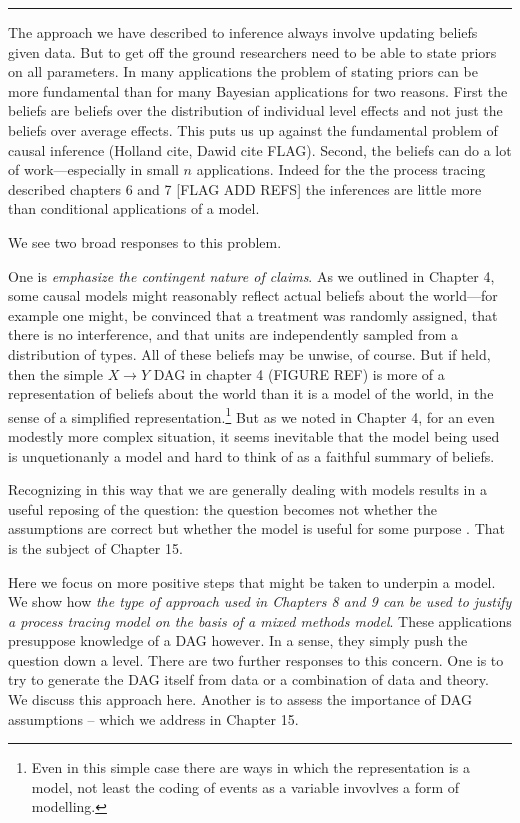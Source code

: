 \documentclass[
  12pt,
]{book}
\begin{document}
\begin{center}\rule{0.5\linewidth}{0.5pt}\end{center}

The approach we have described to inference always involve updating beliefs given data. But to get off the ground researchers need to be able to state priors on all parameters. In many applications the problem of stating priors can be more fundamental than for many Bayesian applications for two reasons. First the beliefs are beliefs over the distribution of individual level effects and not just the beliefs over average effects. This puts us up against the fundamental problem of causal inference (Holland cite, Dawid cite FLAG). Second, the beliefs can do a lot of work---especially in small \(n\) applications. Indeed for the the process tracing described chapters 6 and 7 {[}FLAG ADD REFS{]} the inferences are little more than conditional applications of a model.

We see two broad responses to this problem.

One is \emph{emphasize the contingent nature of claims}. As we outlined in Chapter 4, some causal models might reasonably reflect actual beliefs about the world---for example one might, be convinced that a treatment was randomly assigned, that there is no interference, and that units are independently sampled from a distribution of types. All of these beliefs may be unwise, of course. But if held, then the simple \(X \rightarrow Y\) DAG in chapter 4 (FIGURE REF) is more of a representation of beliefs about the world than it is a model of the world, in the sense of a simplified representation.\footnote{Even in this simple case there are ways in which the representation is a model, not least the coding of events as a variable invovlves a form of modelling.} But as we noted in Chapter 4, for an even modestly more complex situation, it seems inevitable that the model being used is unquetionanly a model and hard to think of as a faithful summary of beliefs.

Recognizing in this way that we are generally dealing with models results in a useful reposing of the question: the question becomes not whether the assumptions are correct but whether the model is useful for some purpose \citep{clarke2012model}. That is the subject of Chapter 15.

Here we focus on more positive steps that might be taken to underpin a model. We show how \emph{the type of approach used in Chapters 8 and 9 can be used to justify a process tracing model on the basis of a mixed methods model}. These applications presuppose knowledge of a DAG however. In a sense, they simply push the question down a level. There are two further responses to this concern. One is to try to generate the DAG itself from data or a combination of data and theory. We discuss this approach here. Another is to assess the importance of DAG assumptions -- which we address in Chapter 15.
\end{document}
